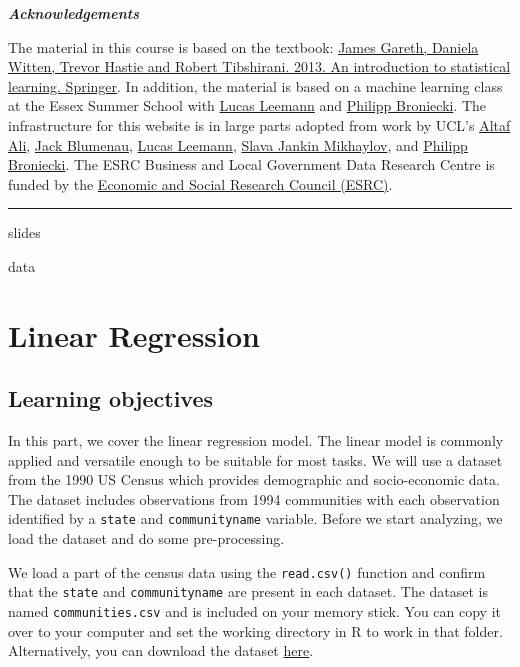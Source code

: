 \documentclass[]{article}
\begin{document}
\textbf{\emph{Acknowledgements}}

The material in this course is based on the textbook: \href{http://faculty.marshall.usc.edu/gareth-james/ISL/ISLR\%20Seventh\%20Printing.pdf}{James Gareth, Daniela Witten, Trevor Hastie and Robert Tibshirani. 2013. An introduction to statistical learning. Springer}. In addition, the material is based on a machine learning class at the Essex Summer School with \href{https://lucasleemann.ch}{Lucas Leemann} and \href{https://philippbroniecki.com}{Philipp Broniecki}. The infrastructure for this website is in large parts adopted from work by UCL's \href{https://iris.ucl.ac.uk/iris/browse/profile?upi=ALIAX58}{Altaf Ali}, \href{https://www.jackblumenau.com/}{Jack Blumenau}, \href{https://lucasleemann.ch}{Lucas Leemann}, \href{https://sjankin.com/}{Slava Jankin Mikhaylov}, and \href{https://philippbroniecki.com}{Philipp Broniecki}. The ESRC Business and Local Government Data Research Centre is funded by the \href{https://esrc.ukri.org}{Economic and Social Research Council (ESRC)}.

\begin{center}\rule{0.5\linewidth}{\linethickness}\end{center}

slides

data

\hypertarget{linear-regression}{%
\section{Linear Regression}\label{linear-regression}}

\hypertarget{learning-objectives}{%
\subsection{Learning objectives}\label{learning-objectives}}

In this part, we cover the linear regression model. The linear model is commonly applied and versatile enough to be suitable for most tasks. We will use a dataset from the 1990 US Census which provides demographic and socio-economic data. The dataset includes observations from 1994 communities with each observation identified by a \texttt{state} and \texttt{communityname} variable. Before we start analyzing, we load the dataset and do some pre-processing.

We load a part of the census data using the \texttt{read.csv()} function and confirm that the \texttt{state} and \texttt{communityname} are present in each dataset. The dataset is named \texttt{communities.csv} and is included on your memory stick. You can copy it over to your computer and set the working directory in R to work in that folder. Alternatively, you can download the dataset \href{http://philippbroniecki.github.io/ML2017.io/data/communities.csv}{here}.
\end{document}
